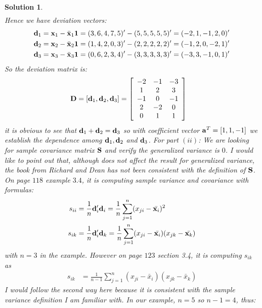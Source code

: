 \documentclass[11pt]{article}
\newtheorem{sol}{Solution}
\begin{document}
\begin{sol}
\begin{align*}
	 \end{align*}
	 Hence we have deviation vectors:
	 \begin{align*}
	 	{\bf d}_1 &= {\bf x}_1 - \bar{{\bf x}}_1{\bf 1} = (3, 6, 4, 7, 5)' - (5, 5, 5, 5, 5)' = (-2, 1, -1, 2, 0)'\\
	 	{\bf d}_2 &= {\bf x}_2 - \bar{{\bf x}}_2{\bf 1} = (1, 4, 2, 0, 3)' - (2, 2, 2, 2, 2)' = (-1, 2, 0, -2, 1)'\\
	 	{\bf d}_3 &= {\bf x}_3 - \bar{{\bf x}}_3{\bf 1} = (0, 6, 2, 3, 4)' - (3, 3, 3, 3, 3)' = (-3, 3, -1, 0, 1)'
	 \end{align*}
	 So the deviation matrix is:
	 \begin{align*}
	 	{\bf D} &= \left[{\bf d}_1, {\bf d}_2 , {\bf d}_3\right] = \left[\begin{array}{ccc}-2&-1&-3\\ 1&2&3\\ -1&0&-1\\ 2&-2&0\\0 &1&1\end{array}\right]
	 \end{align*}
	 it is obvious to see that ${\bf d}_1 + {\bf d}_2= {\bf d}_3$ so with coefficient vector ${\bf a}^T = [1, 1, -1]$ we establish the dependence among ${\bf d}_1, {\bf d}_2$ and ${\bf d}_3$.\vskip 2mm
	 For part $(ii)$:\vskip 2mm
	We are looking for sample covariance matrix ${\bf S}$ and verify the generalized variance is $0$.\vskip 2mm
	I would like to point out that, although does not affect the result for generalized variance, the book from Richard and Dean has not been consistent with the definition of ${\bf S}$. On page $118$ example $3.4$, it is computing sample variance and covariance with formulas:
	\begin{align*}
		s_{ii} &= \frac{1}{n}{\bf d}'_i{\bf d}_i = \frac{1}{n}\sum_{j = 1}^n (x_{ji} - \bar{{\bf x}_i})^2\\
		s_{ik} &= \frac{1}{n}{\bf d}'_i{\bf d}_k = \frac{1}{n}\sum_{j = 1}^n(x_{ji} - \bar{{\bf x}_i})(x_{jk} - \bar{{\bf x}_k})
	\end{align*}
	with $n = 3$ in the example.\vskip 2mm
	However on page $123$ section 3.4, it is computing $s_{ik}$ as
	\begin{align*}
		s_{ik} &= \frac{1}{n - 1}\sum_{j = 1}^{n}(x_{ji} - \bar{x}_i)(x_{jk} - \bar{x}_k)
	\end{align*}
	I would follow the second way here because it is consistent with the sample variance definition I am familiar with.\vskip 2mm
	In our example, $n = 5$ so $ n - 1 = 4$, thus:

\end{sol}
\end{document}
